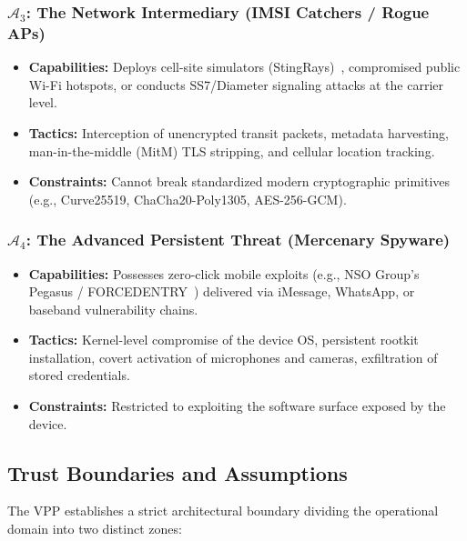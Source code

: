 \subsubsection{$\mathcal{A}_3$: The Network Intermediary (IMSI Catchers / Rogue APs)}
\begin{itemize}
    \item \textbf{Capabilities:} Deploys cell-site simulators (StingRays)~\cite{vandenbroek2015imsi}, compromised public Wi-Fi hotspots, or conducts SS7/Diameter signaling attacks at the carrier level.
    \item \textbf{Tactics:} Interception of unencrypted transit packets, metadata harvesting, man-in-the-middle (MitM) TLS stripping, and cellular location tracking.
    \item \textbf{Constraints:} Cannot break standardized modern cryptographic primitives (e.g., Curve25519, ChaCha20-Poly1305, AES-256-GCM).
\end{itemize}

\subsubsection{$\mathcal{A}_4$: The Advanced Persistent Threat (Mercenary Spyware)}
\begin{itemize}
    \item \textbf{Capabilities:} Possesses zero-click mobile exploits (e.g., NSO Group's Pegasus / FORCEDENTRY~\cite{marczak2021pegasus}) delivered via iMessage, WhatsApp, or baseband vulnerability chains.
    \item \textbf{Tactics:} Kernel-level compromise of the device OS, persistent rootkit installation, covert activation of microphones and cameras, exfiltration of stored credentials.
    \item \textbf{Constraints:} Restricted to exploiting the software surface exposed by the device.
\end{itemize}

\subsection{Trust Boundaries and Assumptions}
The VPP establishes a strict architectural boundary dividing the operational domain into two distinct zones:

